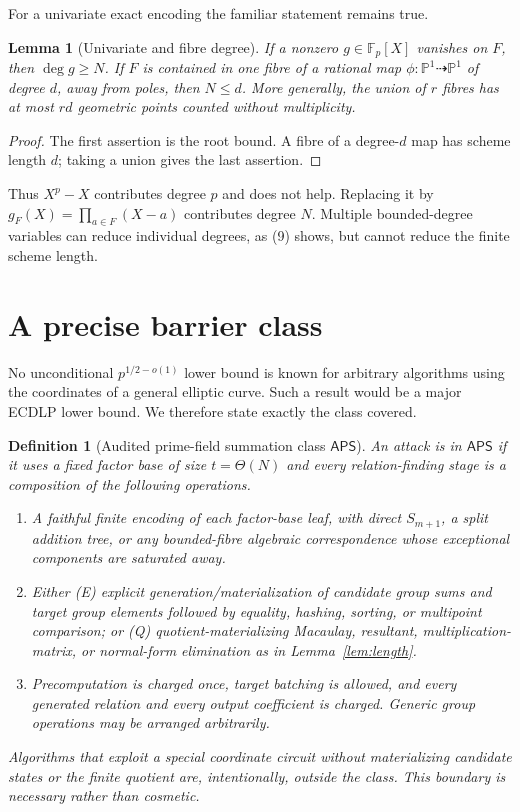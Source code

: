 \documentclass[11pt]{article}
\newtheorem{lemma}[theorem]{Lemma}
\newtheorem{definition}[theorem]{Definition}
\newcommand{\F}{\mathbb F}
\begin{document}
For a univariate exact encoding the familiar statement remains true.

\begin{lemma}[Univariate and fibre degree]
If a nonzero $g\in\F_p[X]$ vanishes on $F$, then $\deg g\ge N$.  If $F$ is
contained in one fibre of a rational map $\phi:\mathbb P^1\dashrightarrow
\mathbb P^1$ of degree $d$, away from poles, then $N\le d$.  More generally,
the union of $r$ fibres has at most $rd$ geometric points counted without
multiplicity.
\end{lemma}

\begin{proof}
The first assertion is the root bound.  A fibre of a degree-$d$ map has scheme
length $d$; taking a union gives the last assertion.
\end{proof}

Thus $X^p-X$ contributes degree $p$ and does not help.  Replacing it by
$g_F(X)=\prod_{a\in F}(X-a)$ contributes degree $N$.  Multiple bounded-degree
variables can reduce individual degrees, as (9) shows, but cannot reduce the
finite scheme length.

\section{A precise barrier class}

No unconditional $p^{1/2-o(1)}$ lower bound is known for arbitrary algorithms
using the coordinates of a general elliptic curve.  Such a result would be a
major ECDLP lower bound.  We therefore state exactly the class covered.

\begin{definition}[Audited prime-field summation class $\mathsf{APS}$]
An attack is in $\mathsf{APS}$ if it uses a fixed factor base of size
$t=\Theta(N)$ and every relation-finding stage is a composition of the
following operations.
\begin{enumerate}
 \item A faithful finite encoding of each factor-base leaf, with direct
       $S_{m+1}$, a split addition tree, or any bounded-fibre algebraic
       correspondence whose exceptional components are saturated away.
 \item Either (E) explicit generation/materialization of candidate group sums
       and target group elements followed by equality, hashing, sorting, or
       multipoint comparison; or (Q) quotient-materializing Macaulay,
       resultant, multiplication-matrix, or normal-form elimination as in
       Lemma~\ref{lem:length}.
 \item Precomputation is charged once, target batching is allowed, and every
       generated relation and every output coefficient is charged.  Generic
       group operations may be arranged arbitrarily.
\end{enumerate}
Algorithms that exploit a special coordinate circuit without materializing
candidate states or the finite quotient are, intentionally, outside the
class.  This boundary is necessary rather than cosmetic.
\end{definition}
\end{document}
